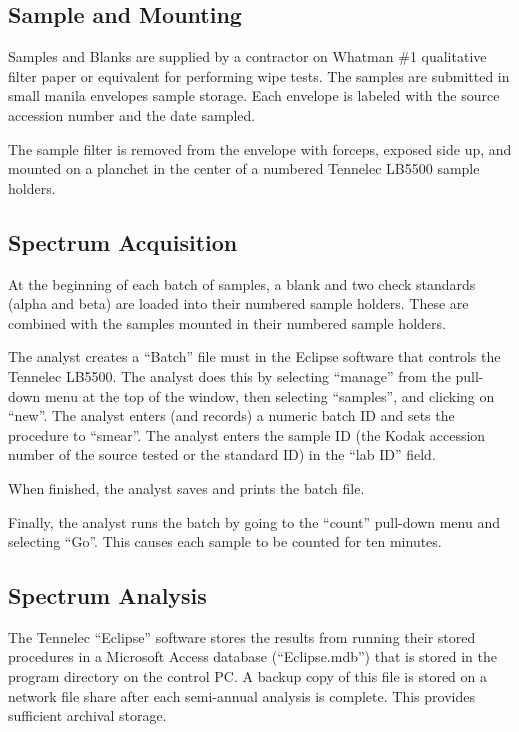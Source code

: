 \documentclass[letterpaper,12pt]{article}
\begin{document}
\subsection*{Sample and Mounting}

Samples and Blanks are supplied by a contractor on Whatman \#1 qualitative
filter paper or equivalent for performing wipe tests. The samples are submitted in
small manila envelopes sample storage. Each envelope is labeled with the source
accession number and the date sampled.

The sample filter is removed from the envelope with forceps, exposed side up,
and mounted on a planchet in the center of a numbered Tennelec LB5500
sample holders.

\subsection*{Spectrum Acquisition}
At the beginning of each batch of samples, a blank and two check standards
(alpha and beta) are loaded into their numbered sample holders. These are combined
with the samples mounted in their numbered sample holders.

The analyst creates a  ``Batch'' file must in the Eclipse software that
controls the Tennelec LB5500. The analyst does this by selecting
``manage'' from the pull-down menu at the top of the window, then selecting
``samples'', and clicking on ``new''. The analyst enters (and records) a
numeric batch ID and sets the procedure to ``smear''. The analyst enters
the sample ID (the Kodak accession number of the source tested or the
standard ID) in the ``lab ID'' field. 

When finished, the analyst saves and prints the batch file.

Finally, the analyst runs the batch by going to the ``count''
pull-down menu and selecting ``Go''. This causes each sample to be
counted for ten minutes.


\subsection*{Spectrum Analysis}

The Tennelec ``Eclipse'' software stores the results
from running their stored procedures in a Microsoft Access
database (``Eclipse.mdb'') that is stored in the program directory
on the control PC. A backup copy of this file is stored on a network
file share after each semi-annual analysis is complete. This provides
sufficient archival storage.
\end{document}
